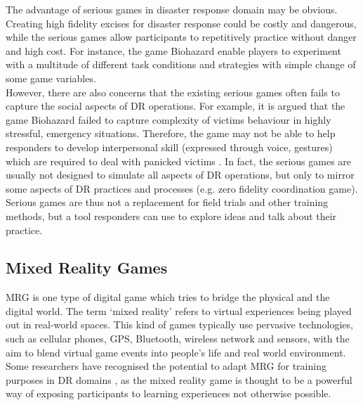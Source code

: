 The advantage of serious games in disaster response domain may be obvious. Creating high fidelity excises for disaster response could be costly and dangerous, while the serious games allow participants to repetitively practice without danger and high cost. For instance, the game Biohazard \cite{Susi2007} enable players to experiment with a multitude of different task conditions and strategies with simple change of some game variables.\\

However, there are also concerns that the existing serious games often fails to capture the social aspects of \ac{DR} operations. For example, it is argued that the game Biohazard failed to capture complexity of victims behaviour in highly stressful, emergency situations. Therefore, the game may not be able to help responders to develop interpersonal skill (expressed through voice, gestures) which are required to deal with panicked victims \cite{Susi2007}. In fact, the serious games are usually not designed to simulate all aspects of \ac{DR} operations, but only to mirror some aspects of \ac{DR} practices and processes (e.g. zero fidelity coordination game). Serious games are thus not a replacement for field trials and other training methods, but a tool responders can use to explore ideas and talk about their practice.\\


\subsection{Mixed Reality Games}
\acf{MRG} is one type of digital game which tries to bridge the physical and the digital \cite{Benford2005} world. The term `mixed reality' refers to virtual experiences being played out in real-world spaces. This kind of games typically use pervasive technologies, such as cellular phones, GPS, Bluetooth, wireless network and sensors, with the aim to blend virtual game events into people's life and real world environment. Some researchers have recognised the potential to adapt \ac{MRG} for training purposes in \ac{DR} domains \cite{Fischer2012}, as the mixed reality game is thought to be a powerful way of exposing participants to learning experiences not otherwise possible. \\

